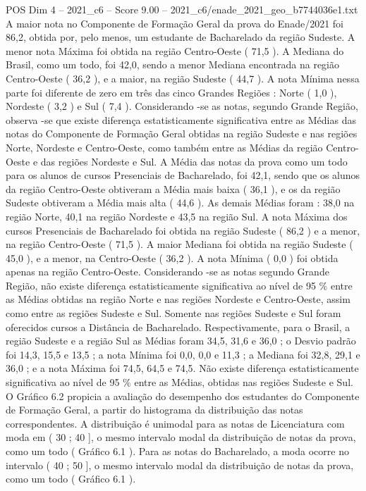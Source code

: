 \begin{textsample}{POS Dim 4 – 2021\_c6 – Score 9.00 – 2021\_c6/enade\_2021\_geo\_b7744036e1.txt}
A maior nota no Componente de Formação Geral da prova do Enade/2021 foi 86,2, obtida por, pelo menos, um estudante de Bacharelado da região Sudeste.
A menor nota Máxima foi obtida na região Centro-Oeste ( 71,5 ).
A Mediana do Brasil, como um todo, foi 42,0, sendo a menor Mediana encontrada na região Centro-Oeste ( 36,2 ), e a maior, na região Sudeste ( 44,7 ).
A nota Mínima nessa parte foi diferente de zero em três das cinco Grandes Regiões : Norte ( 1,0 ), Nordeste ( 3,2 ) e Sul ( 7,4 ).
Considerando -se as notas, segundo Grande Região, observa -se que existe diferença estatisticamente significativa entre as Médias das notas do Componente de Formação Geral obtidas na região Sudeste e nas regiões Norte, Nordeste e Centro-Oeste, como também entre as Médias da região Centro-Oeste e das regiões Nordeste e Sul.
A Média das notas da prova como um todo para os alunos de cursos Presenciais de Bacharelado, foi 42,1, sendo que os alunos da região Centro-Oeste obtiveram a Média mais baixa ( 36,1 ), e os da região Sudeste obtiveram a Média mais alta ( 44,6 ).
As demais Médias foram : 38,0 na região Norte, 40,1 na região Nordeste e 43,5 na região Sul.
A nota Máxima dos cursos Presenciais de Bacharelado foi obtida na região Sudeste ( 86,2 ) e a menor, na região Centro-Oeste ( 71,5 ).
A maior Mediana foi obtida na região Sudeste ( 45,0 ), e a menor, na Centro-Oeste ( 36,2 ).
A nota Mínima ( 0,0 ) foi obtida apenas na região Centro-Oeste.
Considerando -se as notas segundo Grande Região, não existe diferença estatisticamente significativa ao nível de 95 \% entre as Médias obtidas na região Norte e nas regiões Nordeste e Centro-Oeste, assim como entre as regiões Sudeste e Sul.
Somente nas regiões Sudeste e Sul foram oferecidos cursos a Distância de Bacharelado.
Respectivamente, para o Brasil, a região Sudeste e a região Sul as Médias foram 34,5, 31,6 e 36,0 ; o Desvio padrão foi 14,3, 15,5 e 13,5 ; a nota Mínima foi 0,0, 0,0 e 11,3 ; a Mediana foi 32,8, 29,1 e 36,0 ; e a nota Máxima foi 74,5, 64,5 e 74,5.
Não existe diferença estatisticamente significativa ao nível de 95 \% entre as Médias, obtidas nas regiões Sudeste e Sul.
O Gráfico 6.2 propicia a avaliação do desempenho dos estudantes do Componente de Formação Geral, a partir do histograma da distribuição das notas correspondentes.
A distribuição é unimodal para as notas de Licenciatura com moda em ( 30 ; 40 ], o mesmo intervalo modal da distribuição de notas da prova, como um todo ( Gráfico 6.1 ).
Para as notas do Bacharelado, a moda ocorre no intervalo ( 40 ; 50 ], o mesmo intervalo modal da distribuição de notas da prova, como um todo ( Gráfico 6.1 ).

\end{textsample}
